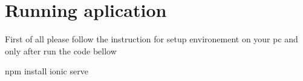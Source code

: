 \documentclass[]{article}
\newenvironment{Shaded}{}{}
\newcommand{\ExtensionTok}[1]{#1}
\newcommand{\NormalTok}[1]{#1}
\begin{document}
\section{Running aplication}\label{running-aplication}

First of all please follow the instruction for setup environement on
your pc and only after run the code bellow

\begin{Shaded}
\begin{Highlighting}[]
\ExtensionTok{npm}\NormalTok{ install }
\ExtensionTok{ionic}\NormalTok{ serve}
\end{Highlighting}
\end{Shaded}
\end{document}
